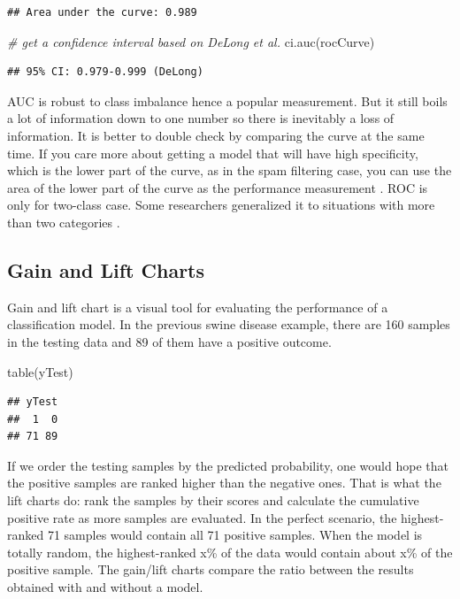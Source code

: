 \documentclass[
  12pt,
]{krantz}
\makeatletter
\newenvironment{Shaded}{\begin{snugshade}}{\end{snugshade}}
\newcommand{\CommentTok}[1]{\textcolor[rgb]{0.37,0.37,0.37}{\textit{#1}}}
\newcommand{\FunctionTok}[1]{\textcolor[rgb]{0,0,0}{#1}}
\newcommand{\NormalTok}[1]{#1}
\newenvironment{kframe}{%
\medskip{}
\setlength{\fboxsep}{.8em}
 \def\at@end@of@kframe{}%
 \ifinner\ifhmode%
  \def\at@end@of@kframe{\end{minipage}}%
  \begin{minipage}{\columnwidth}%
 \fi\fi%
 \def\FrameCommand##1{\hskip\@totalleftmargin \hskip-\fboxsep
 \colorbox{shadecolor}{##1}\hskip-\fboxsep
     \hskip-\linewidth \hskip-\@totalleftmargin \hskip\columnwidth}%
 \MakeFramed {\advance\hsize-\width
   \@totalleftmargin\z@ \linewidth\hsize
   \@setminipage}}%
 {\par\unskip\endMakeFramed%
 \at@end@of@kframe}
\renewenvironment{Shaded}{\begin{kframe}}{\end{kframe}}
\makeatother
\begin{document}
\begin{verbatim}
## Area under the curve: 0.989
\end{verbatim}

\begin{Shaded}
\begin{Highlighting}[]
\CommentTok{\# get a confidence interval based on DeLong et al.}
\FunctionTok{ci.auc}\NormalTok{(rocCurve)}
\end{Highlighting}
\end{Shaded}

\begin{verbatim}
## 95% CI: 0.979-0.999 (DeLong)
\end{verbatim}

AUC is robust to class imbalance\citep{Provost1998, Fawcett2006} hence a popular measurement. But it still boils a lot of information down to one number so there is inevitably a loss of information. It is better to double check by comparing the curve at the same time. If you care more about getting a model that will have high specificity, which is the lower part of the curve, as in the spam filtering case, you can use the area of the lower part of the curve as the performance measurement \citep{McClish1989}. ROC is only for two-class case. Some researchers generalized it to situations with more than two categories \citep{Hand2001, Lachiche2003, Li2008}.

\hypertarget{gain-and-lift-charts}{%
\subsection{Gain and Lift Charts}\label{gain-and-lift-charts}}

Gain and lift chart is a visual tool for evaluating the performance of a classification model. In the previous swine disease example, there are 160 samples in the testing data and 89 of them have a positive outcome.

\begin{Shaded}
\begin{Highlighting}[]
\FunctionTok{table}\NormalTok{(yTest)}
\end{Highlighting}
\end{Shaded}

\begin{verbatim}
## yTest
##  1  0 
## 71 89
\end{verbatim}

If we order the testing samples by the predicted probability, one would hope that the positive samples are ranked higher than the negative ones. That is what the lift charts do: rank the samples by their scores and calculate the cumulative positive rate as more samples are evaluated. In the perfect scenario, the highest-ranked 71 samples would contain all 71 positive samples. When the model is totally random, the highest-ranked x\% of the data would contain about x\% of the positive sample. The gain/lift charts compare the ratio between the results obtained with and without a model.
\end{document}
